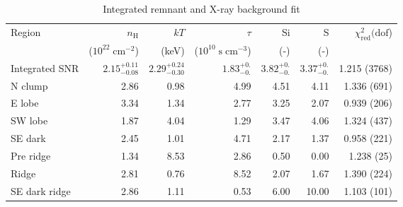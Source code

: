 \documentclass[preprint2,tighten,trackchanges]{aastex6}
\newcommand*{\mt}{\mathrm}
\newcommand*{\unit}[1]{\;\mt{#1}}  %
\begin{document}
\begin{table*}
    \centering
    \caption{Integrated remnant and X-ray background fit
    \label{tab:fits}}
    \begin{tabular}{@{}lrrrrrr@{}}
        \toprule
        Region & $n_\mathrm{H}$             & $kT$  & $\tau$   & Si  & S   & $\chi^2_{\mathrm{red}} (\mathrm{dof}$) \\
               & ($10^{22} \unit{cm^{-2}}$) & (keV) & ($10^{10} \unit{s\;cm^{-3}}$) & (-) & (-) &  \\
        \midrule
        Integrated SNR %
            & ${2.15}^{+0.11}_{-0.08}$ %
            & ${2.29}^{+0.24}_{-0.30}$ %
            & ${1.83}^{+0.}_{-0.}$ %
            & ${3.82}^{+0.}_{-0.}$ %
            & ${3.37}^{+0.}_{-0.}$ %
            & 1.215 (3768) \\  %
        \midrule
        N clump & 2.86 & 0.98 & 4.99 & 4.51 & 4.11 & 1.336 (691) \\  %
        E lobe  & 3.34 & 1.34 & 2.77 & 3.25 & 2.07 & 0.939 (206) \\  %
        SW lobe & 1.87 & 4.04 & 1.29 & 3.47 & 4.06 & 1.324 (437) \\  %
        SE dark & 2.45 & 1.01 & 4.71 & 2.17 & 1.37 & 0.958 (221) \\  %
        \midrule
        Pre ridge & 1.34 & 8.53 & 2.86 & 0.50 & 0.00 & 1.238 (25) \\  %
        Ridge         & 2.81 & 0.76 & 8.52 & 2.07 &  1.67 & 1.390 (224) \\  %
        SE dark ridge & 2.86 & 1.11 & 0.53 & 6.00 & 10.00 & 1.103 (101) \\  %
        \bottomrule
    \end{tabular}
\end{table*}
\end{document}
